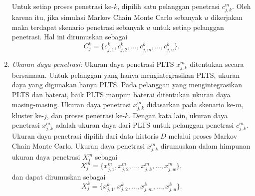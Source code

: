 \begin{enumerate}
    Untuk setiap proses penetrasi ke-${k}$, dipilih satu pelanggan penetrasi $c^m_{j,k}$. Oleh karena itu, jika simulasi Markov Chain Monte Carlo sebanyak $u$ dikerjakan maka terdapat skenario penetrasi sebanyak $u$ untuk setiap pelanggan penetrasi. Hal ini dirumuskan sebagai
    \begin{equation}\label{cpv2}
    \mathit{C^k_j}=\{c^k_{j,1},c^k_{j,2},...,c^k_{j,m},...,c^k_{j,u}\}.
    \end{equation}
    
    \item \textit{Ukuran daya penetrasi}:
    Ukuran daya penetrasi PLTS $x^m_{j,k}$ ditentukan secara bersamaan. Untuk pelanggan yang hanya mengintegrasikan PLTS, ukuran daya yang digunakan hanya PLTS. Pada pelanggan yang mengintegrasikan PLTS dan baterai, baik PLTS maupun baterai ditentukan ukuran daya masing-masing. Ukuran daya penetrasi $x^m_{j,k}$ didasarkan pada skenario ke-$m$, kluster ke-$j$, dan proses penetrasi ke-$k$. Dengan kata lain, ukuran daya penetrasi $x^m_{j,k}$ adalah ukuran daya dari PLTS untuk pelanggan penetrasi $c^m_{j,k}$. Ukuran daya penetrasi dipilih dari data historis $D$ melalui proses Markov Chain Monte Carlo. Ukuran daya penetrasi $x^m_{j,k}$ dirumuskan dalam himpunan ukuran daya penetrasi $X^m_{j}$ sebagai
    \begin{equation}\label{xpv2}
    \mathit{X^m_j}=\{x^m_{j,1},x^m_{j,2},...,x^m_{j,k},...,x^m_{j,w}\},
    \end{equation}
    dan dapat dirumuskan sebagai
    \begin{equation}\label{xpv3}
    \mathit{X^k_j}=\{x^k_{j,1},x^k_{j,2},...,x^k_{j,m},...,x^k_{j,u}\}.
    \end{equation}
    

\end{enumerate}
